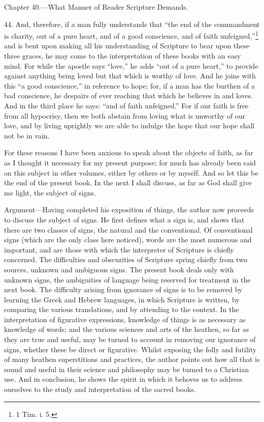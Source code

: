 
Chapter 40.—What Manner of Reader Scripture Demands.

44. And, therefore, if a man fully understands that “the end of the commandment is charity, out of a pure heart, and of a good conscience, and of faith unfeigned,”\footnote{1 Tim. i. 5.} and is bent upon making all his understanding of Scripture to bear upon these three graces, he may come to the interpretation of these books with an easy mind. For while the apostle says “love,” he adds “out of a pure heart,” to provide against anything being loved but that which is worthy of love. And he joins with this “a good conscience,” in reference to hope; for, if a man has the burthen of a bad conscience, he despairs of ever reaching that which he believes in and loves. And in the third place he says: “and of faith unfeigned.” For if our faith is free from all hypocrisy, then we both abstain from loving what is unworthy of our love, and by living uprightly we are able to indulge the hope that our hope shall not be in vain.

For these reasons I have been anxious to speak about the objects of faith, as far as I thought it necessary for my present purpose; for much has already been said on this subject in other volumes, either by others or by myself. And so let this be the end of the present book. In the next I shall discuss, as far as God shall give me light, the subject of signs.


Argument—Having completed his exposition of things, the author now proceeds to discuss the subject of signs. He first defines what a sign is, and shows that there are two classes of signs, the natural and the conventional. Of conventional signs (which are the only class here noticed), words are the most numerous and important, and are those with which the interpreter of Scripture is chiefly concerned. The difficulties and obscurities of Scripture spring chiefly from two sources, unknown and ambiguous signs. The present book deals only with unknown signs, the ambiguities of language being reserved for treatment in the next book. The difficulty arising from ignorance of signs is to be removed by learning the Greek and Hebrew languages, in which Scripture is written, by comparing the various translations, and by attending to the context. In the interpretation of figurative expressions, knowledge of things is as necessary as knowledge of words; and the various sciences and arts of the heathen, so far as they are true and useful, may be turned to account in removing our ignorance of signs, whether these be direct or figurative. Whilst exposing the folly and futility of many heathen superstitions and practices, the author points out how all that is sound and useful in their science and philosophy may be turned to a Christian use. And in conclusion, he shows the spirit in which it behoves us to address ourselves to the study and interpretation of the sacred books.

